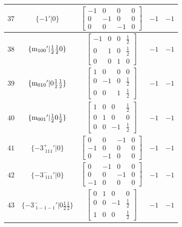 \documentclass[fleqn,8pt]{jsarticle}
\begin{document}
\begin{longtable}{ccccc}
$ 37 $ & $ \{-1{}'|0\} $ & $ \begin{bmatrix} -1 & 0 & 0 & 0 \\ 0 & -1 & 0 & 0 \\ 0 & 0 & -1 & 0 \end{bmatrix} $ & $ -1 $ & $ -1 $ \\ \hline
$ 38 $ & $ \{{\rm m}_{100}{}'|\frac{1}{2} \frac{1}{2} 0\} $ & $ \begin{bmatrix} -1 & 0 & 0 & \frac{1}{2} \\ 0 & 1 & 0 & \frac{1}{2} \\ 0 & 0 & 1 & 0 \end{bmatrix} $ & $ -1 $ & $ -1 $ \\ \hline
$ 39 $ & $ \{{\rm m}_{010}{}'|0 \frac{1}{2} \frac{1}{2}\} $ & $ \begin{bmatrix} 1 & 0 & 0 & 0 \\ 0 & -1 & 0 & \frac{1}{2} \\ 0 & 0 & 1 & \frac{1}{2} \end{bmatrix} $ & $ -1 $ & $ -1 $ \\ \hline
$ 40 $ & $ \{{\rm m}_{001}{}'|\frac{1}{2} 0 \frac{1}{2}\} $ & $ \begin{bmatrix} 1 & 0 & 0 & \frac{1}{2} \\ 0 & 1 & 0 & 0 \\ 0 & 0 & -1 & \frac{1}{2} \end{bmatrix} $ & $ -1 $ & $ -1 $ \\ \hline
$ 41 $ & $ \{-3^{+}_{\,\,111}{}'|0\} $ & $ \begin{bmatrix} 0 & 0 & -1 & 0 \\ -1 & 0 & 0 & 0 \\ 0 & -1 & 0 & 0 \end{bmatrix} $ & $ -1 $ & $ -1 $ \\ \hline
$ 42 $ & $ \{-3^{-}_{\,\,111}{}'|0\} $ & $ \begin{bmatrix} 0 & -1 & 0 & 0 \\ 0 & 0 & -1 & 0 \\ -1 & 0 & 0 & 0 \end{bmatrix} $ & $ -1 $ & $ -1 $ \\ \hline
$ 43 $ & $ \{-3^{-}_{\,\,1-1-1}{}'|0 \frac{1}{2} \frac{1}{2}\} $ & $ \begin{bmatrix} 0 & 1 & 0 & 0 \\ 0 & 0 & -1 & \frac{1}{2} \\ 1 & 0 & 0 & \frac{1}{2} \end{bmatrix} $ & $ -1 $ & $ -1 $ \\ \hline

\end{longtable}
\end{document}
